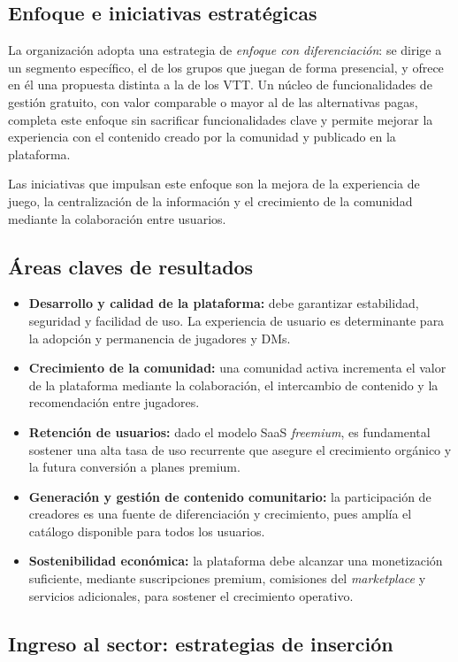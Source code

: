 \subsection{Enfoque e iniciativas estratégicas}
La organización adopta una estrategia de \emph{enfoque con diferenciación}: se dirige a un segmento específico, el de los grupos que juegan de forma presencial, y ofrece en él una propuesta distinta a la de los VTT. Un núcleo de funcionalidades de gestión gratuito, con valor comparable o mayor al de las alternativas pagas, completa este enfoque sin sacrificar funcionalidades clave y permite mejorar la experiencia con el contenido creado por la comunidad y publicado en la plataforma.

Las iniciativas que impulsan este enfoque son la mejora de la experiencia de juego, la centralización de la información y el crecimiento de la comunidad mediante la colaboración entre usuarios.

\subsection{Áreas claves de resultados}
\begin{itemize}
  \item \textbf{Desarrollo y calidad de la plataforma:} debe garantizar estabilidad, seguridad y facilidad de uso. La experiencia de usuario es determinante para la adopción y permanencia de jugadores y DMs.
  \item \textbf{Crecimiento de la comunidad:} una comunidad activa incrementa el valor de la plataforma mediante la colaboración, el intercambio de contenido y la recomendación entre jugadores.
  \item \textbf{Retención de usuarios:} dado el modelo SaaS \textit{freemium}, es fundamental sostener una alta tasa de uso recurrente que asegure el crecimiento orgánico y la futura conversión a planes premium.
  \item \textbf{Generación y gestión de contenido comunitario:} la participación de creadores es una fuente de diferenciación y crecimiento, pues amplía el catálogo disponible para todos los usuarios.
  \item \textbf{Sostenibilidad económica:} la plataforma debe alcanzar una monetización suficiente, mediante suscripciones premium, comisiones del \textit{marketplace} y servicios adicionales, para sostener el crecimiento operativo.
\end{itemize}

\subsection{Ingreso al sector: estrategias de inserción}
